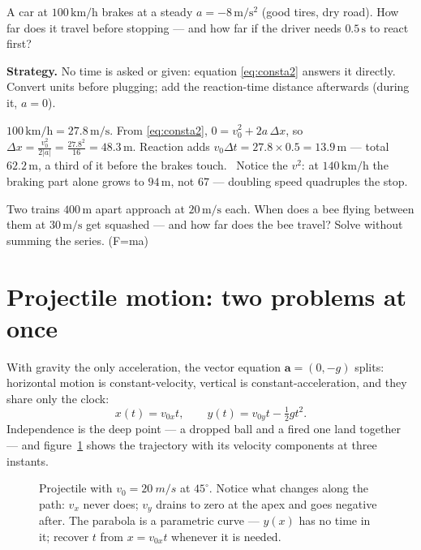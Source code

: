 \begin{example}\label{ex:brake}
A car at $100\,\mathrm{km/h}$ brakes at a steady
$a=-8\,\mathrm{m/s^{2}}$ (good tires, dry road). How far does it travel before
stopping --- and how far if the driver needs $0.5\,\mathrm{s}$ to react first?
\par\smallskip
\textbf{Strategy.} No time is asked or given: equation \eqref{eq:consta2}
answers it directly. Convert units before plugging; add the reaction-time
distance afterwards (during it, $a=0$).
\begin{solution}
$100\,\mathrm{km/h}=27.8\,\mathrm{m/s}$. From \eqref{eq:consta2},
$0=v_0^{2}+2a\,\Delta x$, so
$\Delta x=\frac{v_0^{2}}{2|a|}=\frac{27.8^{2}}{16}=48.3\,\mathrm{m}$.
Reaction adds $v_0\Delta t=27.8\times0.5=13.9\,\mathrm{m}$ --- total
$62.2\,\mathrm{m}$, a third of it before the brakes touch. \checkmark\
Notice the $v^{2}$: at $140\,\mathrm{km/h}$ the braking part alone grows to
$94\,\mathrm{m}$, not $67$ --- doubling speed quadruples the stop.
\end{solution}
\end{example}

\begin{exercise}[medium]
Two trains $400\,\mathrm{m}$ apart approach at $20\,\mathrm{m/s}$ each. When
does a bee flying between them at $30\,\mathrm{m/s}$ get squashed --- and how
far does the bee travel? Solve without summing the series. (F=ma)
\end{exercise}

\section{Projectile motion: two problems at once}\label{sec:kin-proj}

With gravity the only acceleration, the vector equation
$\mathbf a=(0,-g)$ splits: horizontal motion is constant-velocity,
vertical is constant-acceleration, and they share only the clock:
\[
  x(t)=v_{0x}t,\qquad
  y(t)=v_{0y}t-\tfrac12 gt^{2}.
\]
Independence is the deep point --- a dropped ball and a fired one land
together --- and figure~\ref{fig:proj} shows the trajectory with its velocity
components at three instants.

\begin{figure}[htbp]\centering

\caption{Projectile with $v_0=\qty{20}{m/s}$ at $45^{\circ}$. Notice what
changes along the path: $v_x$ never does; $v_y$ drains to zero at the apex and
goes negative after. The parabola is a parametric curve --- $y(x)$ has no
time in it; recover $t$ from $x=v_{0x}t$ whenever it is needed.}
\label{fig:proj}
\end{figure}

